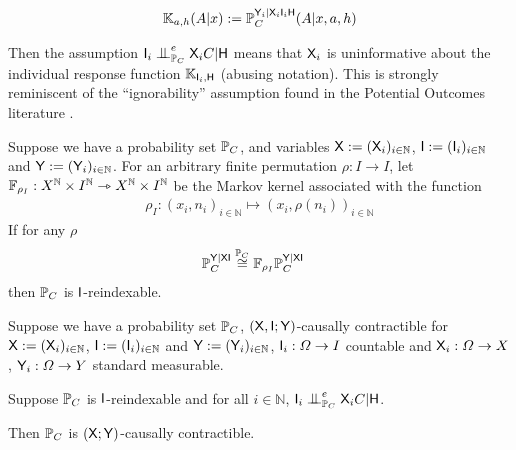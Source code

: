 \begin{align}
    \mathbb{K}_{a,h}(A|x) := \mathbb{P}_C^{\mathsf{Y}_i|\mathsf{X}_i\mathsf{I}_i\mathsf{H}}(A|x,a,h)
\end{align}

Then the assumption $\RV{I}_i\CI^e_{\prob{P}_C} \RV{X}_iC|\RV{H}$ means that $\mathsf{X}_i$ is uninformative about the individual response function $\mathbb{K}_{\mathsf{I}_i,\mathsf{H}}$ (abusing notation). This is strongly reminiscent of the ``ignorability'' assumption found in the Potential Outcomes literature \citep{rubin_causal_2005}.

\begin{definition}[Reindexability]\label{def:ident_permutability}
Suppose we have a probability set $\mathbb{P}_C$, and variables $\mathsf{X}:=(\mathsf{X}_i)_{i\in \mathbb{N}}$, $\mathsf{I}:=(\mathsf{I}_i)_{i\in \mathbb{N}}$ and $\mathsf{Y}:=(\mathsf{Y}_i)_{i\in\mathbb{N}}$. For an arbitrary finite permutation $\rho:I\to I$, let $\mathbb{F}_{\rho_I}:X^\mathbb{N}\times I^{\mathbb{N}}\rightarrowtriangle X^\mathbb{N}\times I^{\mathbb{N}}$ be the Markov kernel associated with the function 
\begin{align}
    \rho_I:(x_i,n_i)_{i\in\mathbb{N}}\mapsto (x_i,\rho(n_i))_{i\in \mathbb{N}}
\end{align}
If for any $\rho$
\begin{align}
    \mathbb{P}_C^{\mathsf{Y}|\mathsf{XI}}&\overset{\mathbb{P}_C}{\cong} \mathbb{F}_{\rho_I}\mathbb{P}_C^{\mathsf{Y}|\mathsf{XI}}
\end{align}
then $\mathbb{P}_C$ is $\mathsf{I}$-reindexable.
\end{definition}

\begin{theorem}\label{th:cc_ind_treat}
Suppose we have a probability set $\mathbb{P}_C$, $(\mathsf{X},\mathsf{I};\mathsf{Y})$-causally contractible for $\mathsf{X}:=(\mathsf{X}_i)_{i\in \mathbb{N}}$, $\mathsf{I}:=(\mathsf{I}_i)_{i\in \mathbb{N}}$ and $\mathsf{Y}:=(\mathsf{Y}_i)_{i\in\mathbb{N}}$, $\mathsf{I}_i:\Omega\to I$ countable and $\mathsf{X}_i:\Omega\to X$, $\mathsf{Y}_i:\Omega\to Y$ standard measurable.

Suppose $\mathbb{P}_C$ is $\mathsf{I}$-reindexable and for all $i\in \mathbb{N}$, $\RV{I}_i\CI^e_{\prob{P}_C} \RV{X}_i C|\RV{H}$. 

Then $\mathbb{P}_C$ is $(\mathsf{X};\mathsf{Y})$-causally contractible.
\end{theorem}

